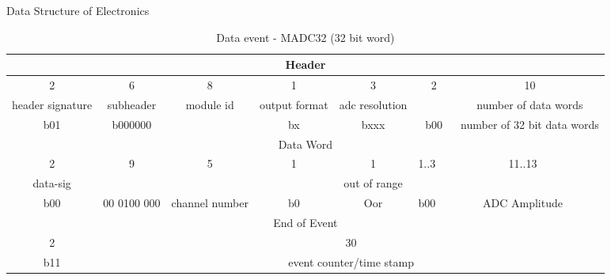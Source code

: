 \begin{landscape}
\begin{table}[]
    \centering
    \label{tab:wordevent}
    \caption{Data Structure of Electronics}
    \begin{subtable}[]{1.3\textwidth}
    \centering
    \small
    \caption{\label{tab:word_MADC}Data event - MADC32 (32 bit word)}
    \begin{tabular}{c|c|c|c|c|c|c|c|c|c|c|c|c|c|c|c|c|c|c|c|c|c|c|c|c|c|c|c|c|c|c|c}
        \toprule
        \multicolumn{32}{c}{Header} \\
        \hline
        \multicolumn{2}{c|}{2} & \multicolumn{6}{|c|}{6} & \multicolumn{8}{|c|}{8} & 1 & \multicolumn{3}{|c|}{3} & \multicolumn{2}{|c|}{2} & \multicolumn{10}{|c}{10} \\
        \multicolumn{2}{c|}{header signature} & \multicolumn{6}{|c|}{subheader} & \multicolumn{8}{|c|}{module id} & output format & \multicolumn{3}{|c|}{adc resolution} & \multicolumn{2}{|c|}{} & \multicolumn{10}{|c}{number of data words} \\
        \hline
        \multicolumn{2}{c|}{b01} & \multicolumn{6}{|c|}{b000000} & \multicolumn{8}{|c|}{} & bx & \multicolumn{3}{|c|}{bxxx} & \multicolumn{2}{|c|}{b00} & \multicolumn{10}{|c}{number of 32 bit data words} \\
        \midrule
        \multicolumn{32}{c}{Data Word} \\
        \hline
        \multicolumn{2}{c|}{2} & \multicolumn{9}{|c|}{9} & \multicolumn{5}{|c|}{5} & 1 & 1 & \multicolumn{3}{|c|}{1..3} & \multicolumn{11}{|c}{11..13} \\
        \multicolumn{2}{c|}{data-sig} & \multicolumn{9}{|c|}{} & \multicolumn{5}{|c|}{} &  & out of range & \multicolumn{3}{|c|}{} & \multicolumn{11}{|c}{} \\
        \hline
        \multicolumn{2}{c|}{b00} & \multicolumn{9}{|c|}{00 0100 000} & \multicolumn{5}{|c|}{channel number} & b0  & Oor & \multicolumn{3}{|c|}{b00} & \multicolumn{11}{|c}{ADC Amplitude} \\
        \midrule
        \multicolumn{32}{c}{End of Event} \\
        \hline
        \multicolumn{2}{c|}{2} & \multicolumn{30}{|c}{30} \\
        \hline
        \multicolumn{2}{c|}{b11} & \multicolumn{30}{|c}{event counter/time stamp} \\
        \bottomrule
    \end{tabular}
    \end{subtable}
    \end{table}
    

\end{landscape}
